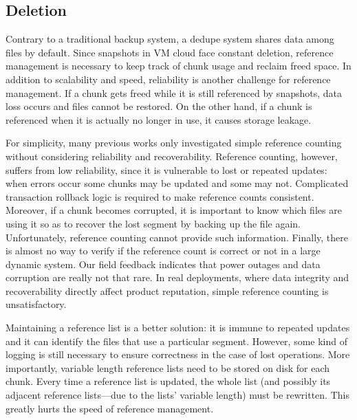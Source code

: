 {\subsection{Deletion}
Contrary to a traditional backup system, a dedupe system
shares data among files by default. 
Since snapshots in VM cloud face constant deletion, 
reference management
is necessary to keep track of chunk usage and reclaim
freed space. In addition to scalability and speed, reliability
is another challenge for reference management.
If a chunk gets freed while it is still referenced by snapshots,
data loss occurs and files cannot be restored. On the other
hand, if a chunk is referenced when it is actually no
longer in use, it causes storage leakage.

For simplicity, many previous works only investigated simple reference
counting without considering reliability
and recoverability. Reference counting, however, suffers
from low reliability, since it is vulnerable to lost or repeated
updates: when errors occur some chunks may
be updated and some may not. Complicated transaction
rollback logic is required to make reference counts consistent.
Moreover, if a chunk becomes corrupted, it is
important to know which files are using it so as to recover
the lost segment by backing up the file again. Unfortunately,
reference counting cannot provide such information.
Finally, there is almost no way to verify if the
reference count is correct or not in a large dynamic system.
Our field feedback indicates that power outages and
data corruption are really not that rare. In real deployments,
where data integrity and recoverability directly
affect product reputation, simple reference counting is
unsatisfactory.

Maintaining a reference list is a better solution: it is
immune to repeated updates and it can identify the files
that use a particular segment. However, some kind of logging
is still necessary to ensure correctness in the case of
lost operations. More importantly, variable length reference
lists need to be stored on disk for each chunk.
Every time a reference list is updated, the whole list (and
possibly its adjacent reference lists—due to the lists’
variable length) must be rewritten. This greatly hurts the
speed of reference management.

}
